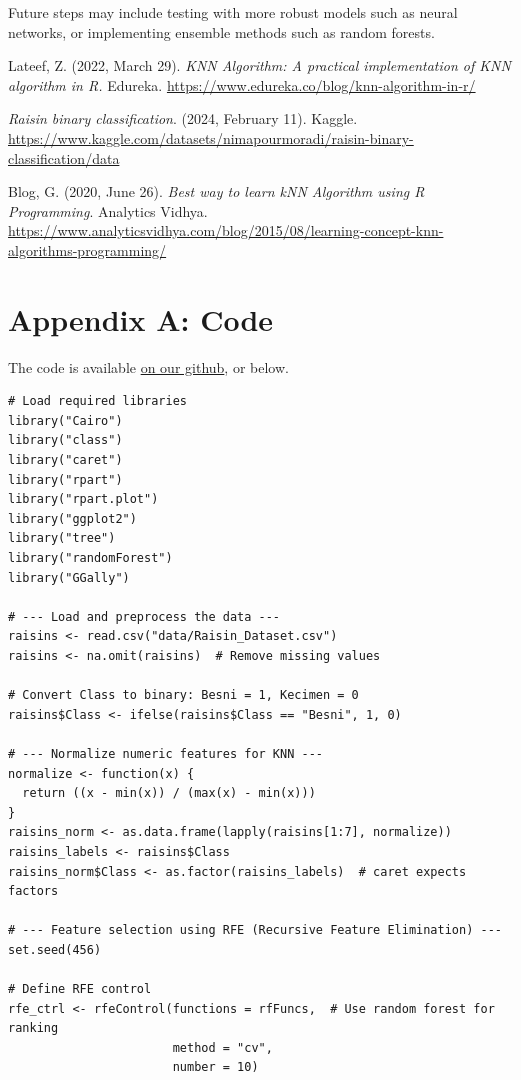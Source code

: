 \documentclass{article}
\begin{document}
\vspace{5mm}

\noindent Future steps may include testing with more robust models such as neural networks, or implementing ensemble methods such as random forests.

\begin{thebibliography}{9}

Lateef, Z. (2022, March 29). \emph{KNN Algorithm: A practical implementation of KNN algorithm in R.} Edureka. \url{https://www.edureka.co/blog/knn-algorithm-in-r/}

\emph{Raisin binary classification}. (2024, February 11). Kaggle. \url{https://www.kaggle.com/datasets/nimapourmoradi/raisin-binary-classification/data}


Blog, G. (2020, June 26). \emph{Best way to learn kNN Algorithm using R Programming}. Analytics Vidhya. \url{https://www.analyticsvidhya.com/blog/2015/08/learning-concept-knn-algorithms-programming/}

\newpage

\section*{Appendix A: Code}
\label{sec:appendixA}
The code is available \href{https://github.com/mshki/math-456/blob/main/essay_4/main.R}{on our github}, or below.

\begin{verbatim}
# Load required libraries
library("Cairo")
library("class")
library("caret")
library("rpart")
library("rpart.plot")
library("ggplot2")
library("tree")
library("randomForest")
library("GGally")

# --- Load and preprocess the data ---
raisins <- read.csv("data/Raisin_Dataset.csv")
raisins <- na.omit(raisins)  # Remove missing values

# Convert Class to binary: Besni = 1, Kecimen = 0
raisins$Class <- ifelse(raisins$Class == "Besni", 1, 0)

# --- Normalize numeric features for KNN ---
normalize <- function(x) {
  return ((x - min(x)) / (max(x) - min(x)))
}
raisins_norm <- as.data.frame(lapply(raisins[1:7], normalize))
raisins_labels <- raisins$Class
raisins_norm$Class <- as.factor(raisins_labels)  # caret expects factors

# --- Feature selection using RFE (Recursive Feature Elimination) ---
set.seed(456)

# Define RFE control
rfe_ctrl <- rfeControl(functions = rfFuncs,  # Use random forest for ranking
                       method = "cv", 
                       number = 10)


\end{verbatim}
\end{thebibliography}
\end{document}
